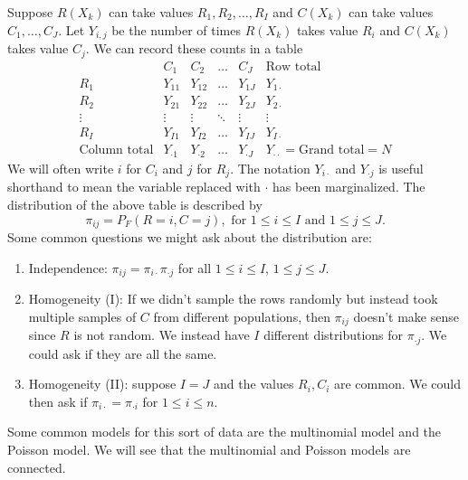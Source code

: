 Suppose $R(X_k)$ can take values $R_1,R_2,\ldots,R_I$ and $C(X_k)$ can take values $C_1,\ldots,C_J$. Let $Y_{i,j}$ be the number of times $R(X_k)$ takes value $R_i$ and $C(X_k)$ takes value  $C_j$. We can record these counts in a table
\[\begin{array}{c|cccc|c}
    &C_1&C_2&\ldots&C_J&\text{Row total}\\
    \hline
R_1 &Y_{11}&Y_{12}&\ldots&Y_{1J}&Y_{1\cdot}\\
R_2&Y_{21}&Y_{22}&\ldots&Y_{2J}&Y_{2\cdot}\\
\vdots&\vdots&\vdots&\ddots&\vdots&\vdots \\
R_I&Y_{I1}&Y_{I2}&\ldots&Y_{IJ}&Y_{I\cdot}\\
\hline 
\text{Column total}& Y_{\cdot 1}&Y_{\cdot 2}&\ldots &Y_{\cdot J} & Y_{\cdot\cdot}=\text{Grand total}=N
\end{array} \]
We will often write $i$ for $C_i$ and $j$ for $R_j$. The notation $Y_{i\cdot}$ and $Y_{\cdot j}$ is useful shorthand to mean the variable replaced with $\cdot$ has been marginalized. The distribution of the above table is described by 
\[\pi_{ij} = P_F(R=i, C=j), \text{ for } 1 \le i \le I \text{ and } 1 \le j \le J. \]
Some common questions we might ask about the distribution are:
\begin{enumerate}
    \item Independence: $\pi_{ij} = \pi_{i \cdot}\pi_{\cdot j}$ for all $1 \le i \le I$, $1 \le j \le J$.
    \item Homogeneity (I): If we didn't sample the rows randomly but instead took multiple samples of $C$ from different populations, then $\pi_{ij}$ doesn't make sense since $R$ is not random. We instead have $I$ different distributions for $\pi_{\cdot j}$. We could ask if they are all the same.
    \item Homogeneity (II): suppose $I=J$ and the values $R_i,C_i$ are common. We could then ask if $\pi_{i \cdot} = \pi_{\cdot i}$ for $1 \le i \le n$. 
\end{enumerate}
Some common models for this sort of data are the multinomial model and the Poisson model. We will see that the multinomial and Poisson models are connected.
